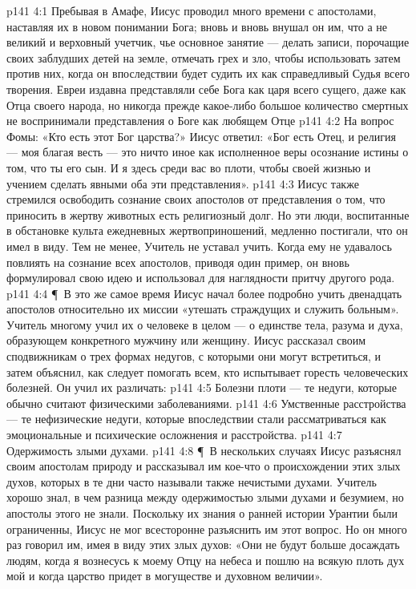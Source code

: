 \vs p141 4:1 Пребывая в Амафе, Иисус проводил много времени с апостолами, наставляя их в новом понимании Бога; вновь и вновь внушал он им, что  а не великий и верховный учетчик, чье основное занятие --- делать записи, порочащие своих заблудших детей на земле, отмечать грех и зло, чтобы использовать затем против них, когда он впоследствии будет судить их как справедливый Судья всего творения. Евреи издавна представляли себе Бога как царя всего сущего, даже как Отца своего народа, но никогда прежде какое\hyp{}либо большое количество смертных не воспринимали представления о Боге как любящем Отце 
\vs p141 4:2 На вопрос Фомы: «Кто есть этот Бог царства?» Иисус ответил: «Бог есть  Отец, и религия --- моя благая весть --- это ничто иное как исполненное веры осознание истины о том, что ты его сын. И я здесь среди вас во плоти, чтобы своей жизнью и учением сделать явными оба эти представления».
\vs p141 4:3 Иисус также стремился освободить сознание своих апостолов от представления о том, что приносить в жертву животных есть религиозный долг. Но эти люди, воспитанные в обстановке культа ежедневных жертвоприношений, медленно постигали, что он имел в виду. Тем не менее, Учитель не уставал учить. Когда ему не удавалось повлиять на сознание всех апостолов, приводя один пример, он вновь формулировал свою идею и использовал для наглядности притчу другого рода.
\vs p141 4:4 \P\ В это же самое время Иисус начал более подробно учить двенадцать апостолов относительно их миссии «утешать страждущих и служить больным». Учитель многому учил их о человеке в целом --- о единстве тела, разума и духа, образующем конкретного мужчину или женщину. Иисус рассказал своим сподвижникам о трех формах недугов, с которыми они могут встретиться, и затем объяснил, как следует помогать всем, кто испытывает горесть человеческих болезней. Он учил их различать:
\vs p141 4:5 \bibnobreakspace Болезни плоти --- те недуги, которые обычно считают физическими заболеваниями.
\vs p141 4:6 \bibnobreakspace Умственные расстройства --- те нефизические недуги, которые впоследствии стали рассматриваться как эмоциональные и психические осложнения и расстройства.
\vs p141 4:7 \bibnobreakspace Одержимость злыми духами.
\vs p141 4:8 \P\ В нескольких случаях Иисус разъяснял своим апостолам природу и рассказывал им кое\hyp{}что о происхождении этих злых духов, которых в те дни часто называли также нечистыми духами. Учитель хорошо знал, в чем разница между одержимостью злыми духами и безумием, но апостолы этого не знали. Поскольку их знания о ранней истории Урантии были ограниченны, Иисус не мог всесторонне разъяснить им этот вопрос. Но он много раз говорил им, имея в виду этих злых духов: «Они не будут больше досаждать людям, когда я вознесусь к моему Отцу на небеса и пошлю на всякую плоть дух мой и когда царство придет в могуществе и духовном величии».
